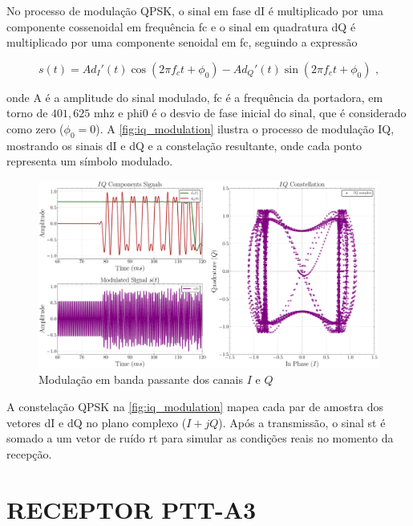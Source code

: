 No processo de modulação QPSK, o sinal em fase \gls{dI} é multiplicado por uma componente cossenoidal em frequência \gls{fc} e o sinal em quadratura \gls{dQ} é multiplicado por uma componente senoidal em \gls{fc}, seguindo a expressão

\vspace{-0.8em}
\begin{equation}
    s(t) = A d_I'(t) \cos(2\pi f_c t + \phi_0) - Ad_Q'(t) \sin(2\pi f_c t + \phi_0) \text{ ,}
\end{equation}

\noindent onde \gls{A} é a amplitude do sinal modulado, \gls{fc} é a frequência da portadora, em torno de $401,625$ \gls{mhz} e \gls{phi0} é o desvio de fase inicial do sinal, que é considerado como zero ($\phi_0 = 0$). A \autoref{fig:iq_modulation} ilustra o processo de modulação IQ, mostrando os sinais \gls{dI} e \gls{dQ} e a constelação resultante, onde cada ponto representa um símbolo modulado.

\begin{figure}[H]
	\centering
	\caption{Modulação em banda passante dos canais $I$ e $Q$}\label{fig:iq_modulation}
	\includegraphics[width=\linewidth]{assets/cap2/transmitter_modulator_time_comp.pdf}
\end{figure}

A constelação \gls{QPSK} na \autoref{fig:iq_modulation} mapea cada par de amostra dos vetores \gls{dI} e \gls{dQ} no plano complexo ($I + jQ$). Após a transmissão, o sinal \gls{st} é somado a um vetor de ruído \gls{rt} para simular as condições reais no momento da recepção.

\section{RECEPTOR PTT-A3}\label{sec:receptor}

